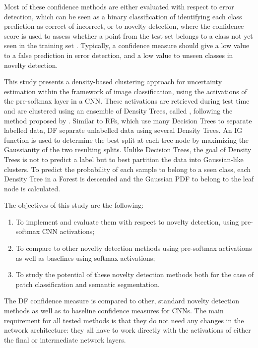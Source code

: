 \documentclass[10pt]{article}
\begin{document}
Most of these confidence methods are either evaluated with respect to error detection, which can be seen as a binary classification of identifying each class prediction as correct of incorrect, or to novelty detection, where the confidence score is used to assess whether a point from the test set belongs to a class not yet seen in the training set \cite{mandelbaum17, deMorsier2014thesis}. Typically, a confidence measure should give a low value to a false prediction in error detection, and a low value to unseen classes in novelty detection.

This study presents a density-based clustering approach for uncertainty estimation within the framework of image classification, using the activations of the pre-softmax layer in a CNN. These activations are retrieved during test time and are clustered using an ensemble of Density Trees, called , following the method proposed by \textcite{decisionForests-MSR}. Similar to \glspl{RF}, which use many Decision Trees to separate labelled data, \acrlong{DF} separate unlabelled data using several Density Trees. An \gls{IG} function is used to determine the best split at each tree node by maximizing the Gaussianity of the two resulting splits. Unlike Decision Trees, the goal of Density Trees is not to predict a label but to best partition the data into Gaussian-like clusters. To predict the probability of each sample to belong to a seen class, each Density Tree in a Forest is descended and the Gaussian \acrfull{PDF} to belong to the leaf node is calculated. 

The objectives of this study are the following:
\begin{enumerate}
    \item To implement  and evaluate them with respect to novelty detection, using pre-softmax \gls{CNN} activations;
    \item To compare  to other novelty detection methods using pre-softmax activations as well as baselines using softmax activations;
    \item To study the potential of these novelty detection methods both for the case of patch classification and semantic segmentation.
\end{enumerate}

The \acrlong{DF} confidence measure is compared to other, standard novelty detection methods as well as to baseline confidence measures for \glspl{CNN}. The main requirement for all tested methods is that they do not need any changes in the network architecture: they all have to work directly with the activations of either the final or intermediate network layers.
\end{document}
